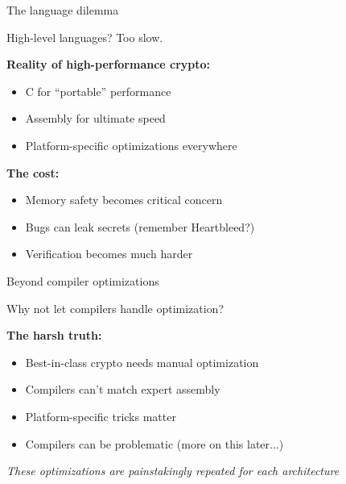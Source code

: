 \documentclass[aspectratio=169, lualatex, handout]{beamer}
\begin{document}
\begin{frame}{The language dilemma}
	\begin{center}
		\Large
		High-level languages? Too slow.
	\end{center}
	\vspace{1em}
	\textbf{Reality of high-performance crypto:}
	\begin{itemize}
		\item C for ``portable'' performance
		\item Assembly for ultimate speed
		\item Platform-specific optimizations everywhere
	\end{itemize}
	\vspace{0.5em}
	\textbf{The cost:}
	\begin{itemize}
		\item Memory safety becomes critical concern
		\item Bugs can leak secrets (remember Heartbleed?)
		\item Verification becomes much harder
	\end{itemize}
\end{frame}

\begin{frame}{Beyond compiler optimizations}
	\begin{center}
		\Large
		Why not let compilers handle optimization?
	\end{center}
	\vspace{1em}
	\textbf{The harsh truth:}
	\begin{itemize}
		\item Best-in-class crypto needs manual optimization
		\item Compilers can't match expert assembly
		\item Platform-specific tricks matter
		\item Compilers can be problematic (more on this later...)
	\end{itemize}
	\vspace{0.5em}
	\begin{center}
		\textit{These optimizations are painstakingly repeated for each architecture}
	\end{center}
\end{frame}
\end{document}
